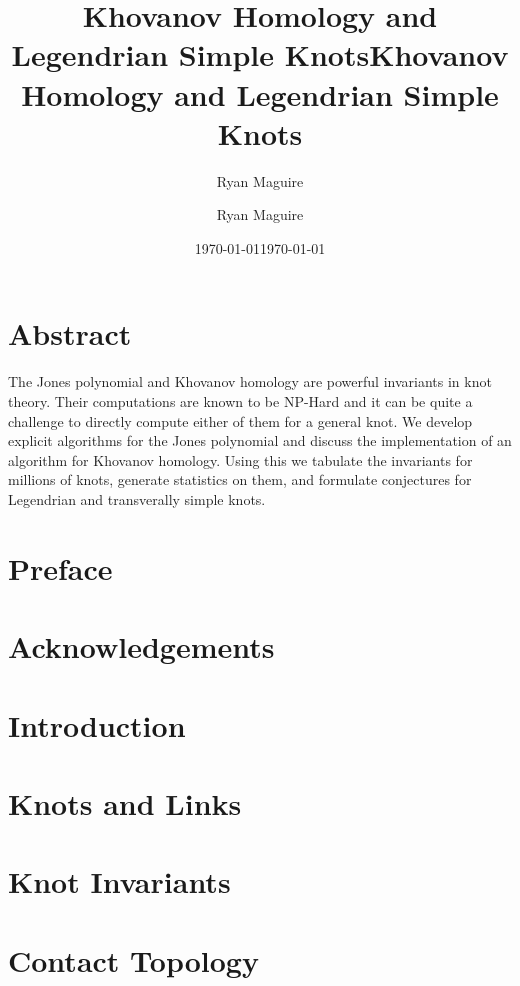 \documentclass{dcthesis}
\title{Khovanov Homology and Legendrian Simple Knots}
\author{Ryan Maguire}
\date{\today}
\title{Khovanov Homology and Legendrian Simple Knots}
\author{Ryan Maguire}
\date{\today}
\theoremstyle{plain}
\theoremstyle{normal}
\begin{document}
    \frontmatter
    \maketitle
    \chapter*{Abstract}
        The Jones polynomial and Khovanov homology are powerful invariants
        in knot theory. Their computations are known to be NP-Hard and it
        can be quite a challenge to directly compute either of them for a
        general knot. We develop explicit algorithms for the Jones polynomial
        and discuss the implementation of an algorithm for Khovanov homology.
        Using this we tabulate the invariants for millions of knots, generate
        statistics on them, and formulate conjectures for Legendrian and
        transverally simple knots.
    \chapter*{Preface}
        
    \chapter*{Acknowledgements}
        
    \tableofcontents
    \listoftables
    \listoffigures
    \mainmatter
    \chapter{Introduction}
        
    \chapter{Knots and Links}
        
        
        
        
    \chapter{Knot Invariants}
        
        
        
        
        
    \chapter{Contact Topology}
        
        
        
        
\end{document}
